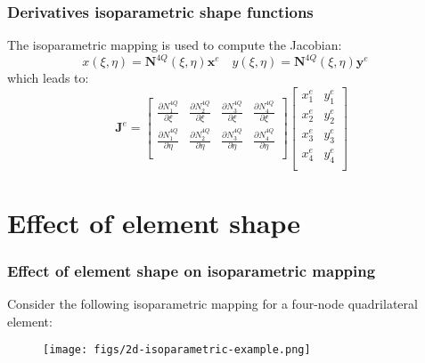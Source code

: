 \documentclass[notes]{beamer}
\begin{document}
\begin{frame}
\frametitle{Derivatives isoparametric shape functions}
The isoparametric mapping is used to compute the Jacobian:
\begin{equation*}
	x(\xi, \eta) = \mathbf{N}^{4Q}(\xi, \eta)\mathbf{x}^e \quad
	y(\xi, \eta) = \mathbf{N}^{4Q}(\xi, \eta)\mathbf{y}^e \quad
\end{equation*}
which leads to:
\begin{equation*}
	\mathbf{J}^e = %
	\begin{bmatrix}
		\frac{\partial N_1^{4Q}}{\partial \xi} &
		\frac{\partial N_2^{4Q}}{\partial \xi} &
		\frac{\partial N_3^{4Q}}{\partial \xi} &
		\frac{\partial N_4^{4Q}}{\partial \xi} \\
		\frac{\partial N_1^{4Q}}{\partial \eta} &
		\frac{\partial N_2^{4Q}}{\partial \eta} &
		\frac{\partial N_3^{4Q}}{\partial \eta} &
		\frac{\partial N_4^{4Q}}{\partial \eta} \\	
	\end{bmatrix}
	\begin{bmatrix}
		x_1^e & y_1^e\\
		x_2^e & y_2^e\\
		x_3^e & y_3^e\\
		x_4^e & y_4^e\\
	\end{bmatrix}
\end{equation*}
\end{frame}

\section{Effect of element shape}
\begin{frame}
\frametitle{Effect of element shape on isoparametric mapping}
Consider the following isoparametric mapping for a four-node quadrilateral element:
\begin{figure}[ht]
	\centering
	\texttt{[image: figs/2d-isoparametric-example.png]}
\end{figure}
\end{frame}
\end{document}
